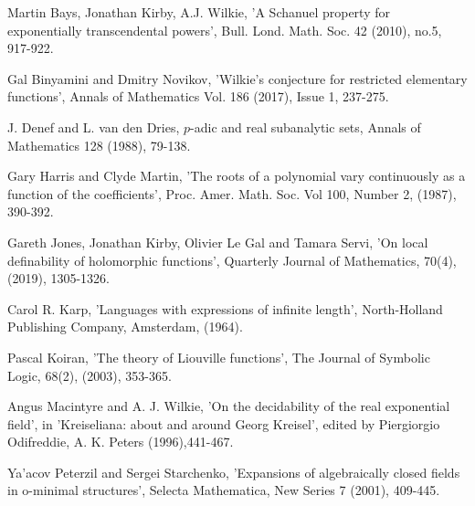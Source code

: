 \documentclass[12pt,nodate]{article}
\begin{document}
 
 
 \noindent
 [BKW] Martin Bays, Jonathan Kirby, A.J. Wilkie, 'A Schanuel property for exponentially transcendental powers', Bull. Lond. Math. Soc. 42 (2010), no.5, 917-922.
 
\vspace{1mm}
 
\noindent
 [BN] Gal Binyamini and Dmitry Novikov, 'Wilkie's conjecture for restricted elementary functions', Annals of Mathematics Vol. 186 (2017), Issue 1, 237-275.
 
\vspace{1mm}
 
\noindent
 [DD] J. Denef and L. van den Dries, $p$-adic and real subanalytic sets, Annals of Mathematics 128 (1988), 79-138.

\vspace{1mm}
 
\noindent
 [HM] Gary Harris and Clyde Martin, 'The roots of a polynomial vary continuously as a function of the coefficients', Proc. Amer. Math. Soc. Vol 100, Number 2, (1987), 390-392.
 
 \vspace{1mm}
 
 \noindent
 [JKLS] Gareth Jones, Jonathan Kirby, Olivier Le Gal and Tamara Servi, 'On local definability of holomorphic functions', Quarterly Journal of Mathematics, 70(4), (2019), 1305-1326.
 
 \vspace{1mm}
 
 \noindent
 [K] Carol R. Karp, 'Languages with expressions of infinite length',
 North-Holland Publishing Company, Amsterdam, (1964).
 
 \vspace{1mm}
 
 \noindent
 [Ko] Pascal Koiran, 'The theory of Liouville functions', The Journal of Symbolic Logic, 68(2), (2003), 353-365.
 \vspace{1mm}
 
 \noindent
 [MW] Angus Macintyre and A. J. Wilkie, 'On the decidability of the real exponential field', in 'Kreiseliana: about and around Georg Kreisel', edited by Piergiorgio Odifreddie, A. K. Peters (1996),441-467.
 
 
 \vspace{1mm}
 
 \noindent
 [PS1] Ya'acov Peterzil and Sergei Starchenko, 'Expansions of algebraically closed fields in o-minimal structures', Selecta Mathematica, New Series 7 (2001), 409-445.
 
\end{document}
